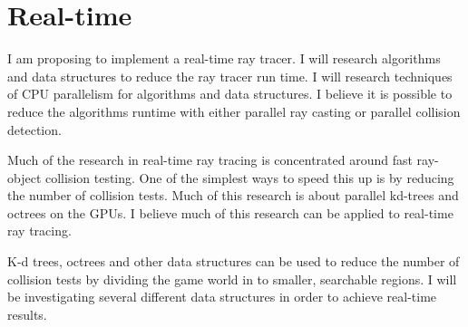 \section{Real-time}
I am proposing to implement a real-time ray tracer.  I will research algorithms and data structures to reduce the ray tracer run time.  I will research techniques of CPU parallelism for algorithms and data structures.  I believe it is possible to reduce the algorithms runtime with either parallel ray casting or parallel collision detection.

Much of the research in real-time ray tracing is concentrated around fast ray-object collision testing.  One of the simplest ways to speed this up is by reducing the number of collision tests\cite{kd:2005}.
Much of this research is about parallel kd-trees and octrees on the GPUs\cite{kd:2007}\cite{fkd:2007}.  I believe much of this research can be applied to real-time ray tracing\cite{kd:2006}.

K-d trees, octrees and other data structures can be used to reduce the number of collision tests by dividing the game world in to smaller, searchable regions.  I will be investigating several different data structures in order to achieve real-time results.	
 


